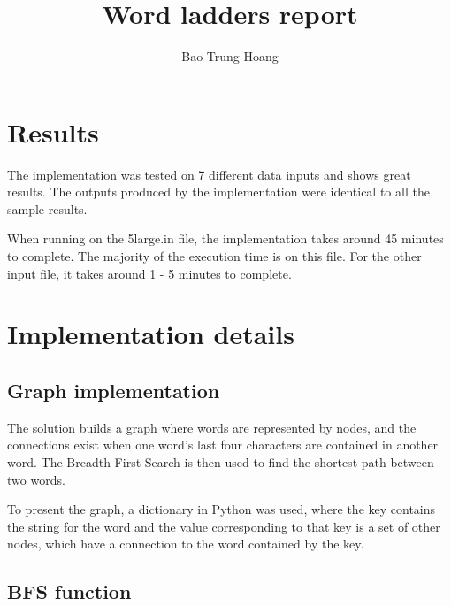 \documentclass{article}
\title{Word ladders report}
\author{Bao Trung Hoang}
\begin{document}
  \maketitle

  \section{Results}

  

  The implementation was tested on 7 different data inputs and shows great results. The outputs produced by the implementation were identical to all the sample results. 

  When running on the 5large.in file, the implementation takes around 45 minutes to complete. The majority of the execution time is on this file. For the other input file, it takes around 1 - 5 minutes to complete. 

  \section{Implementation details}

    \subsection{Graph implementation}
  
    The solution builds a graph where words are represented by nodes, and the connections exist when one word's last four characters are contained in another word. The Breadth-First Search is then used to find the shortest path between two words.

    To present the graph, a dictionary in Python was used, where the key contains the string for the word and the value corresponding to that key is a set of other nodes, which have a connection to the word contained by the key. 

    \subsection{BFS function}
\end{document}
